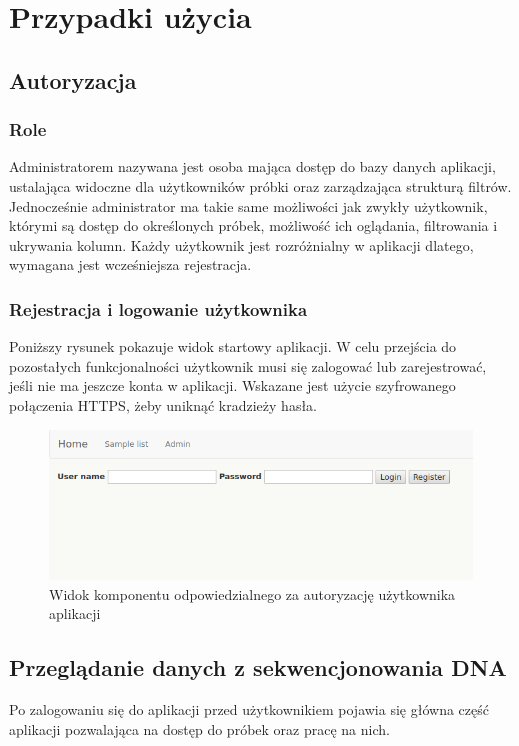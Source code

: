 \documentclass[a4paper,12pt,twoside]{article}
\begin{document}
\newpage

\section{Przypadki użycia}
\subsection{Autoryzacja}
\subsubsection{Role}
Administratorem nazywana jest osoba mająca dostęp do bazy danych aplikacji, ustalająca
widoczne dla użytkowników próbki oraz zarządzająca strukturą filtrów.
Jednocześnie administrator ma takie same możliwości jak zwykły użytkownik, którymi są dostęp do określonych próbek, możliwość ich oglądania, filtrowania i ukrywania kolumn.
Każdy użytkownik jest rozróżnialny w aplikacji dlatego, wymagana jest wcześniejsza rejestracja.

\subsubsection{Rejestracja i logowanie użytkownika}
Poniższy rysunek pokazuje widok startowy aplikacji. W celu przejścia do pozostałych funkcjonalności użytkownik musi się zalogować lub zarejestrować, jeśli nie ma jeszcze
konta w aplikacji. Wskazane jest użycie szyfrowanego połączenia HTTPS, żeby uniknąć
kradzieży hasła.

\begin{figure}[h!]
\includegraphics[width=\linewidth]{obrazy/aplikacja/login.png}
\caption{Widok komponentu odpowiedzialnego za autoryzację użytkownika aplikacji}
\label{fig:loginpic}
\end{figure}

\newpage
\subsection{Przeglądanie danych z sekwencjonowania DNA} \label{sssec:dnaPage}
Po zalogowaniu się do aplikacji przed użytkownikiem pojawia się główna część aplikacji pozwalająca na dostęp do próbek oraz pracę na nich.
\end{document}
